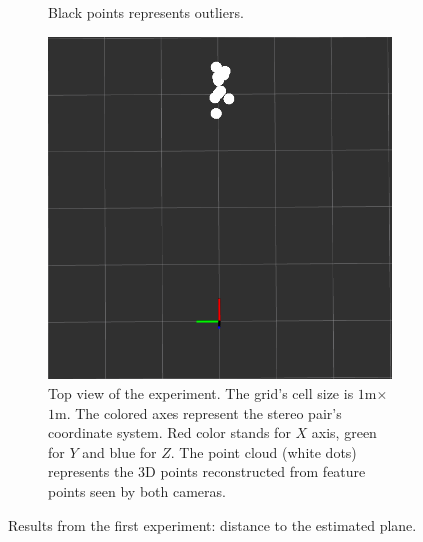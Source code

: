 \begin{figure}[ht]
\begin{subfigure}[ht]{0.49\textwidth}
{        Black points represents outliers.
    }
    \label{fig:exp_1_chart_dists}
  \end{subfigure}
  \hfill
  \begin{subfigure}[ht]{0.49\textwidth}
    \centering
    \includegraphics[width=\textwidth]{graphics/experiment_1_4m.png}
    \caption[Top view of the experiment.]{Top view of the experiment. 
    The grid's cell size is $1$m$\times$$1$m.
    The colored axes represent the stereo pair's coordinate system.
    Red color stands for $X$ axis, green for $Y$ and blue for $Z$.
    The point cloud (white dots) represents the 3D points reconstructed from feature points seen by both cameras.}
    \label{fig:exp_1_topview}
  \end{subfigure}
  \caption{Results from the first experiment: distance to the estimated plane.}
  \label{fig:exp_1_exp}
\end{figure}


